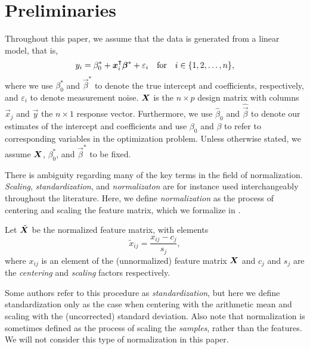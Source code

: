 \section{Preliminaries}

Throughout this paper, we assume that the data is generated from a linear model, that is,
\[
  y_i = \beta_0^* + \boldsymbol x_i^\intercal \boldsymbol\beta^* + \varepsilon_i \quad\text{for}\quad i \in \{1, 2, \dots, n\},
\]
where we use \(\beta_0^*\) and \(\vec\beta^*\) to denote the true intercept and
coefficients, respectively, and \(\varepsilon_i\) to denote measurement noise. \(\boldsymbol X\)
is the \(n \times p\) design matrix with columns \(\vec x_j\) and \(\vec y\) the \(n \times
1\) response vector. Furthermore, we use \(\hat\beta_0\) and \(\hat{\vec{\beta}}\) to
denote our estimates of the intercept and coefficients and use \(\beta_0\) and \(\beta\) to
refer to corresponding variables in the optimization problem. Unless otherwise stated, we
assume \(\boldsymbol{X}\), \(\beta_0^*\), and \(\vec{\beta}^*\) to be fixed.

There is ambiguity regarding many of the key terms in the field of normalization.
\emph{Scaling}, \emph{standardization}, and \emph{normalizaton} are for instance used
interchangeably throughout the literature. Here, we define \emph{normalization} as the
process of centering and scaling the feature matrix, which we formalize in
.

\begin{definition}[Normalization]
  \label{def:normalization}
  Let \(\tilde{\boldsymbol X}\) be the normalized feature matrix, with elements
  \[
    \tilde{x}_{ij} = \frac{x_{ij} - c_{j}}{s_j},
  \]
  where \(x_{ij}\) is an element of the (unnormalized) feature matrix \(\boldsymbol{X}\) and \(c_j\)
  and \(s_j\) are the \emph{centering} and \emph{scaling} factors respectively.
\end{definition}

Some authors refer to this procedure as \emph{standardization}, but here we define
standardization only as the case when centering with the arithmetic mean and scaling with
the (uncorrected) standard deviation. Also note that normalization is sometimes defined as
the process of scaling the \emph{samples}, rather than the features. We will not consider
this type of normalization in this paper.

